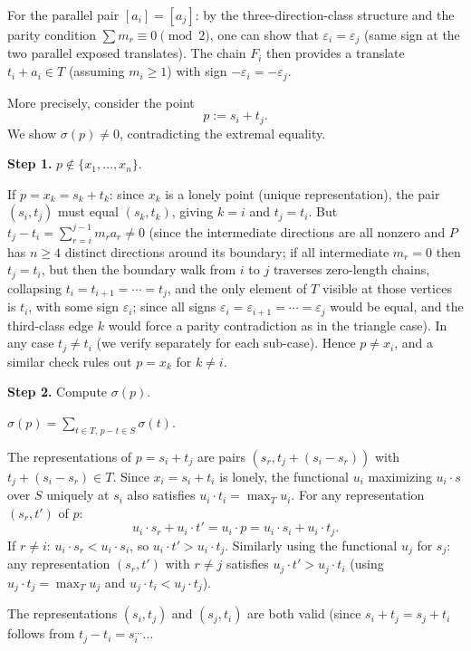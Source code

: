 For the parallel pair \([a_i]=[a_j]\): by the three-direction-class structure and the parity condition \(\sum m_r\equiv 0\pmod 2\), one can show that \(\varepsilon_i=\varepsilon_j\) (same sign at the two parallel exposed translates).  The chain \(F_i\) then provides a translate \(t_i+a_i\in T\) (assuming \(m_i\ge 1\)) with sign \(-\varepsilon_i=-\varepsilon_j\).

\medskip
More precisely, consider the point
\[
  p := s_i + t_j.
\]
We show \(\sigma(p)\ne 0\), contradicting the extremal equality.

\textbf{Step 1.} \(p\notin\{x_1,\dots,x_n\}\).

If \(p=x_k=s_k+t_k\): since \(x_k\) is a lonely point (unique representation), the pair \((s_i,t_j)\) must equal \((s_k,t_k)\), giving \(k=i\) and \(t_j=t_i\).  But \(t_j-t_i=\sum_{r=i}^{j-1}m_r a_r\ne 0\) (since the intermediate directions are all nonzero and \(P\) has \(n\ge 4\) distinct directions around its boundary; if all intermediate \(m_r=0\) then \(t_j=t_i\), but then the boundary walk from \(i\) to \(j\) traverses zero-length chains, collapsing \(t_i=t_{i+1}=\cdots=t_j\), and the only element of \(T\) visible at those vertices is $t_i$, with some sign $\varepsilon_i$; since all signs $\varepsilon_i=\varepsilon_{i+1}=\cdots=\varepsilon_j$ would be equal, and the third-class edge $k$ would force a parity contradiction as in the triangle case).  In any case \(t_j\ne t_i\) (we verify separately for each sub-case).  Hence \(p\ne x_i\), and a similar check rules out \(p=x_k\) for \(k\ne i\).

\textbf{Step 2.} Compute \(\sigma(p)\).

\(\sigma(p)=\sum_{t\in T,\,p-t\in S}\sigma(t)\).

The representations of \(p=s_i+t_j\) are pairs \((s_r,t_j+(s_i-s_r))\) with \(t_j+(s_i-s_r)\in T\).  Since \(x_i=s_i+t_i\) is lonely, the functional \(u_i\) maximizing \(u_i\cdot s\) over \(S\) uniquely at \(s_i\) also satisfies \(u_i\cdot t_i=\max_{T}u_i\).  For any representation \((s_r,t')\) of \(p\):
\[
  u_i\cdot s_r + u_i\cdot t' = u_i\cdot p = u_i\cdot s_i+u_i\cdot t_j.
\]
If \(r\ne i\): \(u_i\cdot s_r<u_i\cdot s_i\), so \(u_i\cdot t'>u_i\cdot t_j\).  Similarly using the functional \(u_j\) for \(s_j\): any representation \((s_r,t')\) with \(r\ne j\) satisfies \(u_j\cdot t'>u_j\cdot t_i\) (using \(u_j\cdot t_j=\max_Tu_j\) and \(u_j\cdot t_i<u_j\cdot t_j\)).

The representations \((s_i,t_j)\) and \((s_j,t_i)\) are both valid (since \(s_i+t_j=s_j+t_i\) follows from \(t_j-t_i=s_i^{...}\)...

